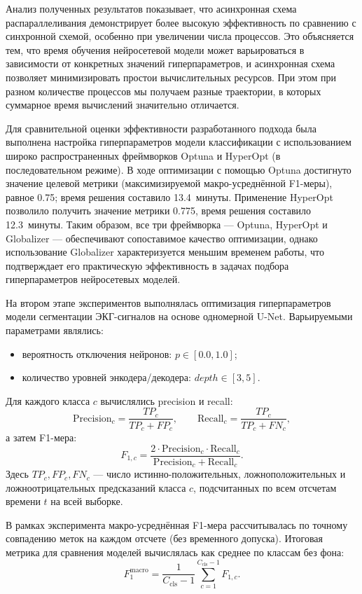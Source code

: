 \documentclass[10pt,a4paper]{book}
\begin{document}
Анализ полученных результатов показывает, что асинхронная схема распараллеливания демонстрирует более высокую эффективность по сравнению с синхронной схемой, особенно при увеличении числа процессов. Это объясняется тем, что время обучения нейросетевой модели может варьироваться в зависимости от конкретных значений гиперпараметров, и асинхронная схема позволяет минимизировать простои вычислительных ресурсов. При этом при разном количестве процессов мы получаем разные траектории, в которых суммарное время вычислений значительно отличается.

Для сравнительной оценки эффективности разработанного подхода была выполнена настройка гиперпараметров модели классификации с использованием широко распространенных фреймворков Optuna и HyperOpt (в последовательном режиме). В ходе оптимизации с помощью Optuna достигнуто значение целевой метрики (максимизируемой макро-усреднённой F1-меры), равное 0.75; время решения составило 13.4~минуты. Применение HyperOpt позволило получить значение метрики 0.775, время решения составило 12.3~минуты. Таким образом, все три фреймворка --- Optuna, HyperOpt и Globalizer --- обеспечивают сопоставимое качество оптимизации, однако использование Globalizer характеризуется меньшим временем работы, что подтверждает его практическую эффективность в задачах подбора гиперпараметров нейросетевых моделей.

На втором этапе экспериментов выполнялась оптимизация гиперпараметров модели сегментации ЭКГ-сигналов на основе одномерной U-Net. Варьируемыми параметрами являлись:
\begin{itemize}
    \item вероятность отключения нейронов: $p \in [0.0, 1.0]$;
    \item количество уровней энкодера/декодера: $depth \in [3, 5]$.
\end{itemize}

Для каждого класса $c$ вычислялись precision и recall:
\[
\mathrm{Precision}_c=\frac{TP_c}{TP_c+FP_c}, \qquad
\mathrm{Recall}_c=\frac{TP_c}{TP_c+FN_c},
\]
а затем F1-мера:
\[
F_{1,c} = \frac{2\cdot \mathrm{Precision}_c\cdot \mathrm{Recall}_c}{\mathrm{Precision}_c+\mathrm{Recall}_c}.
\]
Здесь $TP_c, FP_c, FN_c$ --- число истинно-положительных, ложноположительных и ложноотрицательных предсказаний класса $c$, подсчитанных по всем отсчетам времени $t$ на всей выборке.

В рамках эксперимента макро-усреднённая F1-мера рассчитывалась по точному совпадению меток на каждом отсчете (без временного допуска). Итоговая метрика для сравнения моделей вычислялась как среднее по классам без фона:
\[
F_1^{\mathrm{macro}} = \frac{1}{C_{\mathrm{cls}}-1}\sum_{c=1}^{C_{\mathrm{cls}}-1} F_{1,c}.
\]
\end{document}
